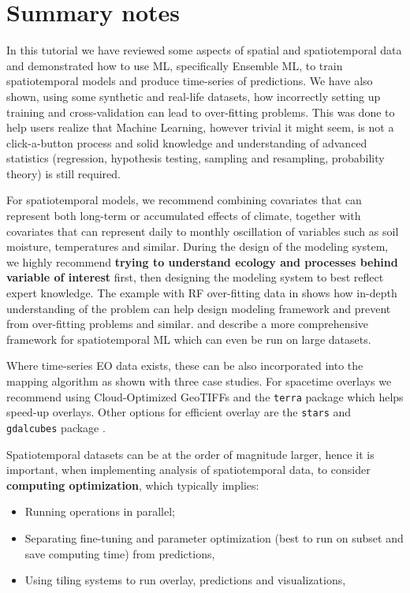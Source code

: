 \documentclass[
  graybox,natbib,nospthms]{svmono}
\providecommand{\tightlist}{%
  \setlength{\itemsep}{0pt}\setlength{\parskip}{0pt}}
\providecommand{\tightlist}{\setlength{\itemsep}{0pt}\setlength{\parskip}{0pt}}
\begin{document}
\hypertarget{summary-notes}{%
\section{Summary notes}\label{summary-notes}}

In this tutorial we have reviewed some aspects of spatial and
spatiotemporal data and demonstrated how to use ML, specifically
Ensemble ML, to train spatiotemporal models and produce time-series of
predictions. We have also shown, using some synthetic and real-life datasets, how
incorrectly setting up training and cross-validation can lead to
over-fitting problems. This was done to help users realize that Machine Learning,
however trivial it might seem, is not a click-a-button process and solid knowledge
and understanding of advanced statistics (regression, hypothesis testing,
sampling and resampling, probability theory) is still required.

For spatiotemporal models, we recommend combining covariates that
can represent both long-term or accumulated effects of climate, together with
covariates that can represent daily to monthly oscillation of variables such as soil
moisture, temperatures and similar. During the design of the modeling system,
we highly recommend \textbf{trying to understand ecology and processes behind
variable of interest} first, then designing the modeling system to best reflect expert
knowledge. The example with RF over-fitting data in \citet{gasch2015spatio} shows how in-depth
understanding of the problem can help design modeling framework and prevent
from over-fitting problems and similar. \citet{witjes2021spatiotemporal} and \citet{Bonannella2022} describe a more comprehensive
framework for spatiotemporal ML which can even be run on large datasets.

Where time-series EO data exists, these can be also incorporated into the
mapping algorithm as shown with three case studies. For spacetime overlays we
recommend using Cloud-Optimized GeoTIFFs and the \texttt{terra} package \citep{hijmans2019spatial} which helps speed-up overlays. Other options for efficient overlay are the \texttt{stars} and \texttt{gdalcubes} package \citep{appel2019demand}.

Spatiotemporal datasets can be at the order of magnitude larger, hence
it is important, when implementing analysis of spatiotemporal data, to
consider \textbf{computing optimization}, which typically implies:

\begin{itemize}
\tightlist
\item
  Running operations in parallel;
\item
  Separating fine-tuning and parameter optimization (best to run on
  subset and save computing time) from predictions,
\item
  Using tiling systems to run overlay, predictions and visualizations,
\end{itemize}
\end{document}

